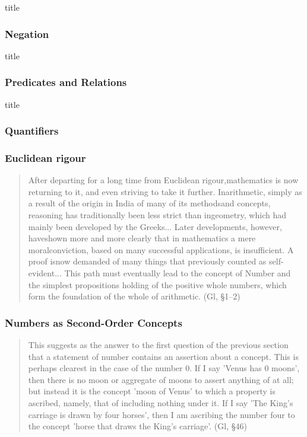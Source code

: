 \documentclass[compress,12pt]{beamer}
\begin{document}
\begin{frame}{title}
    \frametitle{Negation}
    \begin{quote}
        
    \end{quote}
\end{frame}

\begin{frame}{title}
    \frametitle{Predicates and Relations}
    \begin{quote}
        
    \end{quote}
\end{frame}

\begin{frame}{title}
    \frametitle{Quantifiers}
    \begin{quote}
        
    \end{quote}
\end{frame}


\begin{frame}
    \frametitle{Euclidean rigour}
    \begin{quote}
        After departing for a long time from Euclidean rigour,mathematics is now returning to it, and even striving to take it further. Inarithmetic, simply as a result of the origin in India of many of its methodsand concepts, reasoning has traditionally been less strict than ingeometry, which had mainly been developed by the Greeks... Later developments, however, haveshown more and more clearly that in mathematics a mere moralconviction, based on many successful applications, is insufficient. A proof isnow demanded of many things that previously counted as self-evident...  This path must eventually lead to the concept of Number and the simplest propositions holding of the positive whole numbers, which form the foundation of the whole of arithmetic. (Gl, \S1--2)
    \end{quote}
\end{frame}

\begin{frame}
    \frametitle{Numbers as Second-Order Concepts}
    \begin{quote}
        This suggests as the answer to the first question of the previous section that a statement of number contains an assertion about a concept. This is perhaps clearest in the case of the number 0. If I say 'Venus has 0 moons', then there is no moon or aggregate of moons to assert anything of at all; but instead it is the concept 'moon of Venus' to which a property is ascribed, namely, that of including nothing under it. If I say 'The King's carriage is drawn by four horses', then I am ascribing the number four to the concept 'horse that draws the King's carriage'. (Gl, \S46)
    \end{quote}
\end{frame}
\end{document}

